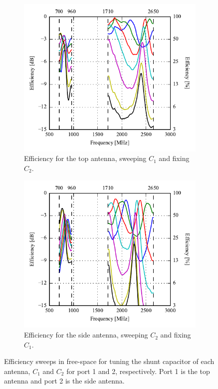 \begin{figure}[htbp]
   \begin{subfigure}[b]{0.49\linewidth}
        \centering
        \includegraphics{img/tech_sol/monopole/prototype_v2/meas_efficiency_top}
        \caption{Efficiency for the top antenna, sweeping $C_1$ and fixing $C_2$.}
        \label{fig:ant1_proto_meas_topeff}
    \end{subfigure}
    \hfill
    \begin{subfigure}[b]{0.49\linewidth}
        \centering
        \includegraphics{img/tech_sol/monopole/prototype_v2/meas_efficiency_side}
        \caption{Efficiency for the side antenna, sweeping $C_2$ and fixing $C_1$.}
        \label{fig:ant1_proto_meas_sideeff}
    \end{subfigure}
    \caption{Efficiency sweeps in free-space for tuning the shunt capacitor of each antenna, $C_1$ and $C_2$ for port 1 and 2, respectively. Port 1 is the top antenna and port 2 is the side antenna.}
    \label{fig:eff_mono_proto_meas}
\end{figure}

